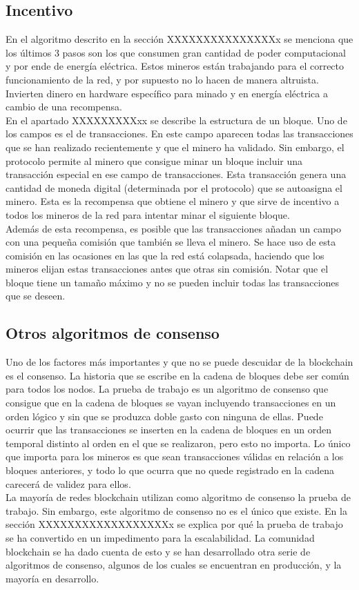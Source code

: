 \subsection{Incentivo}

En el algoritmo descrito en la sección XXXXXXXXXXXXXXXx se menciona que los últimos 3 pasos son los que consumen gran cantidad de poder computacional y por ende de energía eléctrica. Estos mineros están trabajando para el correcto funcionamiento de la red, y por supuesto no lo hacen de manera altruista. Invierten dinero en hardware específico para minado y en energía eléctrica a cambio de una recompensa. \\
En el apartado XXXXXXXXXxx se describe la estructura de un bloque. Uno de los campos es el de transacciones. En este campo aparecen todas las transacciones que se han realizado recientemente y que el minero ha validado. Sin embargo, el protocolo permite al minero que consigue minar un bloque incluir una transacción especial en ese campo de transacciones. Esta transacción genera una cantidad de moneda digital (determinada por el protocolo) que se autoasigna el minero. Esta es la recompensa que obtiene el minero y que sirve de incentivo a todos los mineros de la red para intentar minar el siguiente bloque. \\
Además de esta recompensa, es posible que las transacciones añadan un campo con una pequeña comisión que también se lleva el minero. Se hace uso de esta comisión en las ocasiones en las que la red está colapsada, haciendo que los mineros elijan estas transacciones antes que otras sin comisión. Notar que el bloque tiene un tamaño máximo y no se pueden incluir todas las transacciones que se deseen.


\subsection{Otros algoritmos de consenso}

Uno de los factores más importantes y que no se puede descuidar de la blockchain es el consenso. La historia que se escribe en la cadena de bloques debe ser común para todos los nodos. La prueba de trabajo es un algoritmo de consenso que consigue que en la cadena de bloques se vayan incluyendo transacciones en un orden lógico y sin que se produzca doble gasto con ninguna de ellas. Puede ocurrir que las transacciones se inserten en la cadena de bloques en un orden temporal distinto al orden en el que se realizaron, pero esto no importa. Lo único que importa para los mineros es que sean transacciones válidas en relación a los bloques anteriores, y todo lo que ocurra que no quede registrado en la cadena carecerá de validez para ellos. \\
La mayoría de redes blockchain utilizan como algoritmo de consenso la prueba de trabajo. Sin embargo, este algoritmo de consenso no es el único que existe. En la sección XXXXXXXXXXXXXXXXXXx se explica por qué la prueba de trabajo se ha convertido en un impedimento para la escalabilidad. La comunidad blockchain se ha dado cuenta de esto y se han desarrollado otra serie de algoritmos de consenso, algunos de los cuales se encuentran en producción, y la mayoría en desarrollo.

